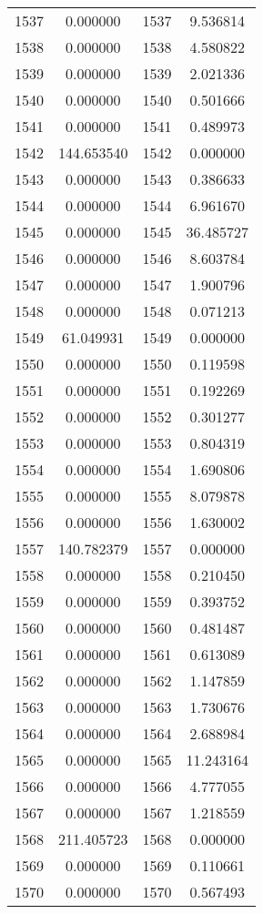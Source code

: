 \documentclass[12pt]{article}
\begin{document}
\begin{longtable}{@{}cccc@{}}
1537 & 0.000000 & 1537 & 9.536814 \\
1538 & 0.000000 & 1538 & 4.580822 \\
1539 & 0.000000 & 1539 & 2.021336 \\
1540 & 0.000000 & 1540 & 0.501666 \\
1541 & 0.000000 & 1541 & 0.489973 \\
1542 & 144.653540 & 1542 & 0.000000 \\
1543 & 0.000000 & 1543 & 0.386633 \\
1544 & 0.000000 & 1544 & 6.961670 \\
1545 & 0.000000 & 1545 & 36.485727 \\
1546 & 0.000000 & 1546 & 8.603784 \\
1547 & 0.000000 & 1547 & 1.900796 \\
1548 & 0.000000 & 1548 & 0.071213 \\
1549 & 61.049931 & 1549 & 0.000000 \\
1550 & 0.000000 & 1550 & 0.119598 \\
1551 & 0.000000 & 1551 & 0.192269 \\
1552 & 0.000000 & 1552 & 0.301277 \\
1553 & 0.000000 & 1553 & 0.804319 \\
1554 & 0.000000 & 1554 & 1.690806 \\
1555 & 0.000000 & 1555 & 8.079878 \\
1556 & 0.000000 & 1556 & 1.630002 \\
1557 & 140.782379 & 1557 & 0.000000 \\
1558 & 0.000000 & 1558 & 0.210450 \\
1559 & 0.000000 & 1559 & 0.393752 \\
1560 & 0.000000 & 1560 & 0.481487 \\
1561 & 0.000000 & 1561 & 0.613089 \\
1562 & 0.000000 & 1562 & 1.147859 \\
1563 & 0.000000 & 1563 & 1.730676 \\
1564 & 0.000000 & 1564 & 2.688984 \\
1565 & 0.000000 & 1565 & 11.243164 \\
1566 & 0.000000 & 1566 & 4.777055 \\
1567 & 0.000000 & 1567 & 1.218559 \\
1568 & 211.405723 & 1568 & 0.000000 \\
1569 & 0.000000 & 1569 & 0.110661 \\
1570 & 0.000000 & 1570 & 0.567493 \\

\end{longtable}
\end{document}
